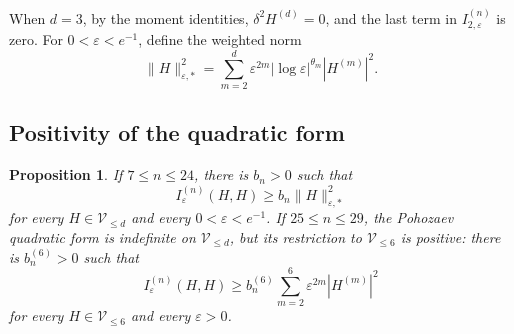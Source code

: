 \documentclass[11pt]{article}
\numberwithin{equation}{section}
\newtheorem{proposition}[theorem]{Proposition}
\theoremstyle{remark}
\begin{document}
When $d=3$,  {by the moment identities,}
\(\delta^2H^{(d)}=0\), and the last term
in $I_{2,\varepsilon}^{(n)}$ is zero.
For \(0<\varepsilon<e^{-1}\), define the weighted norm
{
\begin{equation*}
 \|H\|_{\varepsilon,*}^2
 =\sum_{m=2}^d\varepsilon^{2m}|\log\varepsilon|^{\theta_m}
 |H^{(m)}|^2.
\end{equation*}
}
\subsection*{Positivity of the quadratic form}

 \begin{proposition}\label{prop:kms-algebraic-positivity}
If $7\le n\le24$, there is $b_n>0$ such that
{
\[
 I_\varepsilon^{(n)}(H,H)
 \ge b_n\|H\|_{\varepsilon,*}^2
\]
}
for every $H\in\mathcal V_{\le d}$ and every
$0<\varepsilon<e^{-1}$.
If $25\le n\le29$, the Pohozaev quadratic form is
indefinite on $\mathcal V_{\le d}$, but its restriction to
$\mathcal V_{\le6}$ is positive: there is $b_n^{(6)}>0$ such that
{
\[
 I_\varepsilon^{(n)}(H,H)
 \ge b_n^{(6)}\sum_{m=2}^6\varepsilon^{2m}|H^{(m)}|^2
\]
}
 for every $H\in\mathcal V_{\le 6}$ and every $\varepsilon>0$.
\end{proposition}
\end{document}
